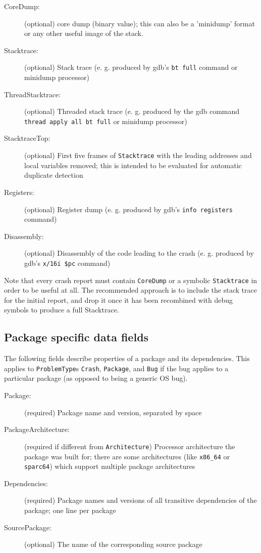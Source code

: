 \documentclass[DIV12,halfparskip]{scrartcl}
\begin{document}
\begin{description}
    \item [CoreDump:] (optional) core dump (binary value); this can also be a
    'minidump' format or any other useful image of the stack.

    \item [Stacktrace:] (optional) Stack trace (e. g. produced by gdb's
    \verb!bt full! command or minidump processor)

    \item [ThreadStacktrace:] (optional) Threaded stack trace (e. g. produced
    by the gdb command \verb!thread apply all bt full! or minidump processor)

    \item [StacktraceTop:] (optional) First five frames of \verb!Stacktrace!
    with the leading addresses and local variables removed; this is intended to
    be evaluated for automatic duplicate detection 

    \item [Registers:] (optional) Register dump (e. g. produced by gdb's 
    \verb!info registers! command)

    \item [Disassembly:] (optional) Disassembly of the code leading to the
    crash (e. g. produced by gdb's \verb!x/16i $pc! command)
\end{description}

Note that every crash report must contain \verb!CoreDump! or a symbolic
\verb!Stacktrace! in order to be useful at all. The recommended approach is to
include the stack trace for the initial report, and drop it once it has been
recombined with debug symbols to produce a full Stacktrace.

\subsection{Package specific data fields}

The following fields describe properties of a package and its dependencies.
This applies to \verb!ProblemType!s \verb!Crash!, \verb!Package!, and
\verb!Bug! if the bug applies to a particular package (as opposed to being a
generic OS bug).

\begin{description}
    \item [Package:] (required) Package name and version, separated by space

    \item [PackageArchitecture:] (required if different from
    \verb!Architecture!) Processor architecture the package
    was built for; there are some architectures (like \verb!x86_64! or
    \verb!sparc64!) which support multiple package architectures

    \item [Dependencies:] (required) Package names and versions of all
    transitive dependencies of the package; one line per package

    \item [SourcePackage:] (optional) The name of the corresponding source package
\end{description}
\end{document}
